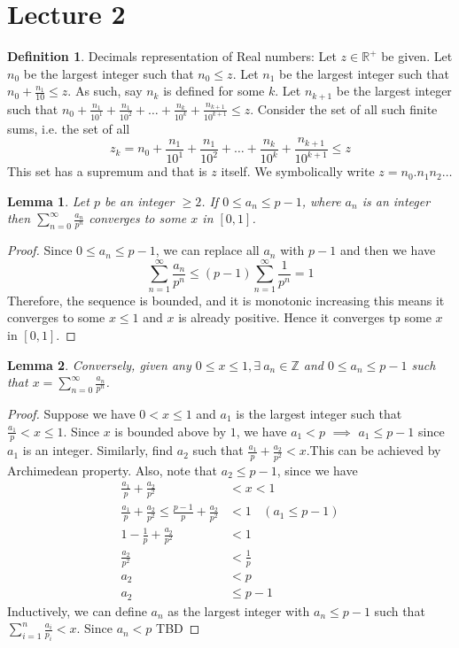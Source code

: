 \documentclass[12pt]{report}
\newtheorem{lem}{Lemma}
\theoremstyle{definition}
\newtheorem{defn}{Definition}
\begin{document}
\section*{Lecture 2}
\begin{defn}
    Decimals representation of Real numbers: Let $z \in \mathbb{R}^+$ be given. Let $n_0$ be the largest integer such that $n_0 \leq z$. Let $n_1$ be the largest integer such that $n_0 + \frac{n_1}{10} \leq z$. As such, say $n_k$ is defined for some $k$. Let $n_{k+1}$ be the largest integer such that $n_0 + \frac{n_1}{10^1} + \frac{n_1}{10^2} + \dots + \frac{n_k}{10^k}+\frac{n_{k+1}}{10^{k+1}} \leq z$. Consider the set of all such finite sums, i.e. the set of all
    $$ z_k = n_0 + \frac{n_1}{10^1} + \frac{n_1}{10^2} + \dots + \frac{n_k}{10^k}+\frac{n_{k+1}}{10^{k+1}} \leq z$$
    This set has a supremum and that is $z$ itself. We symbolically write $z = n_0.n_1n_2 \dots $
\end{defn}
\begin{lem}
    Let $p$ be an integer $\geq 2$. If $0 \leq a_n \leq p-1$, where $a_n$ is an integer then $\sum\limits_{n=0}^{\infty} \frac{a_n}{p^n}$ converges to some $x$ in $[0,1]$.
\end{lem}
\begin{proof}
    Since $0 \leq a_n \leq p-1$, we can replace all $a_n$ with $p-1$ and then we have$$ \sum\limits_{n=1}^{\infty} \frac{a_n}{p^n} \leq (p-1)\sum\limits_{n=1}^{\infty} \frac{1}{p^n} = 1$$
    Therefore, the sequence is bounded, and it is monotonic increasing this means it converges to some $x \leq 1$ and $x$ is already positive. Hence it converges tp some $x$ in $[0,1]$. 
\end{proof}
\begin{lem}
    Conversely, given any  $ 0 \leq x \leq 1, \exists~ a_n \in \mathbb{Z}$ and $0 \leq  a_n \leq p-1$ such that $x = \sum\limits_{n=0}^{\infty} \frac{a_n}{p^n}$.
\end{lem}
\begin{proof}
    Suppose we have $0 < x \leq 1$ and $a_1$ is the largest integer such that $ \frac{a_1}{p} < x \leq 1$. Since $x$ is bounded above by $1$, we have $ a_1 < p$ $\implies$ $a_1 \leq p-1$ since $a_1$ is an integer. Similarly, find $a_2$ such that $\frac{a_1}{p} + \frac{a_2}{p^2} < x$.This can be achieved by Archimedean property. Also, note that $a_2 \leq p-1$, since we have 
    \begin{align*}
        \frac{a_1}{p} + \frac{a_2}{p^2} &< x < 1\\
        \frac{a_1}{p} + \frac{a_2}{p^2} \leq \frac{p-1}{p} + \frac{a_2}{p^2} &< 1~~~~ (a_1 \leq p-1)\\
        1 - \frac{1}{p} + \frac{a_2}{p^2} &< 1\\
        \frac{a_2}{p^2} &< \frac{1}{p}\\
        a_2 &< p \\
        a_2 &\leq p-1
    \end{align*}
Inductively, we can define $a_n$ as the largest integer with $a_n \leq p-1$ such that $\sum\limits_{i=1}^{n} \frac{a_i}{p_i} < x$. Since $a_n < p$
TBD
\end{proof}
\end{document}
